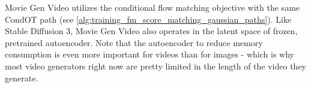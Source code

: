 Movie Gen Video utilizes the conditional flow matching objective with the same CondOT path (see \cref{alg:training_fm_score_matching_gaussian_paths}). Like Stable Diffusion 3, Movie Gen Video also operates in the latent space of frozen, pretrained autoencoder. Note that the autoencoder to reduce memory consumption is even more important for videos than for images - which is why most video generators right now are pretty limited in the length of the video they generate.
